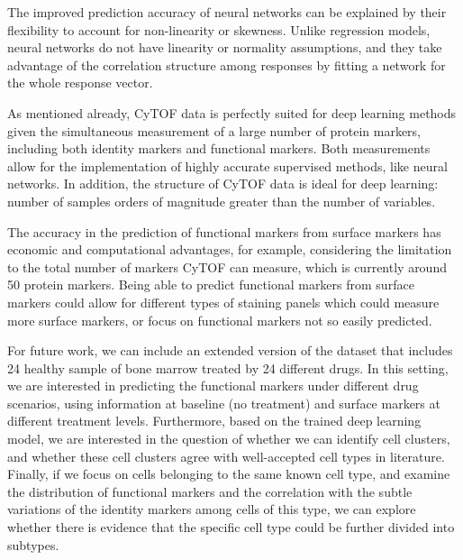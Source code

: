 \documentclass[conference]{IEEEtran}
\begin{document}
The improved prediction accuracy of neural networks can be explained
by their flexibility to account for non-linearity or skewness.  Unlike
regression models, neural networks do not have linearity or normality
assumptions, and they take advantage of the correlation structure
among responses by fitting a network for the whole response vector.

As mentioned already, CyTOF data is perfectly suited for deep learning
methods given the simultaneous measurement of a large number of
protein markers, including both identity markers and functional
markers. Both measurements allow for the implementation of highly
accurate supervised methods, like neural networks. In addition, the
structure of CyTOF data is ideal for deep learning: number of samples
orders of magnitude greater than the number of variables.

The accuracy in the prediction of functional markers from surface markers has economic and computational advantages, for example, considering the limitation to the total number of markers CyTOF can measure, which is currently around 50 protein markers. Being able to predict functional markers from surface markers could allow for different types of staining panels which could measure more surface markers, or focus on functional markers not so easily predicted.


For future work, we can include an extended version of the
dataset\cite{Bendall2011,Qiu2011} that includes 24 healthy sample of
bone marrow treated by 24 different drugs. In this setting, we are
interested in predicting the functional markers under different drug
scenarios, using information at baseline (no treatment) and surface
markers at different treatment levels.
Furthermore, based on the trained deep learning model, we are
interested in the question of whether we can identify cell clusters,
and whether these cell clusters agree with well-accepted cell types in
literature.
Finally, if we focus on cells belonging to the same known cell type, and
examine the distribution of functional markers and the correlation
with the subtle variations of the identity markers among cells of this
type, we can explore whether there is evidence that the specific cell
type could be further divided into subtypes.



\end{document}
